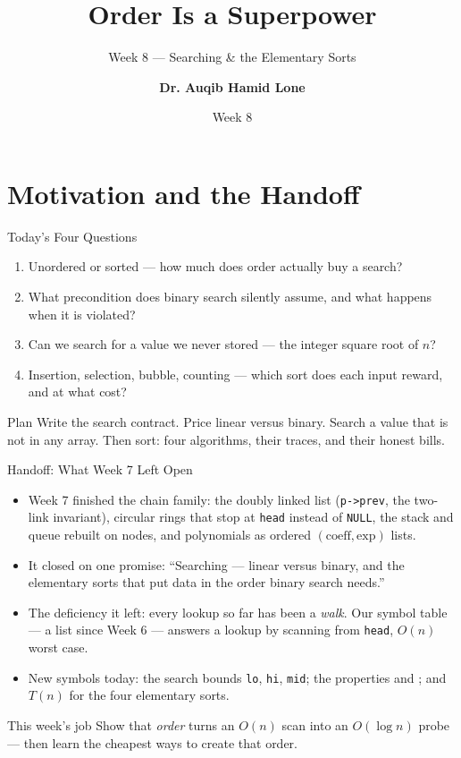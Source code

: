 \documentclass[aspectratio=169]{beamer}
\title{Order Is a Superpower}
\subtitle{Week 8 --- Searching \& the Elementary Sorts}
\author[Dr. Auqib Hamid Lone]{\textbf{Dr. Auqib Hamid Lone}}
\institute[GCET Ganderbal]{PCC CS-301: Data Structures\\GCET, Ganderbal}
\date[Week 8]{\small Week 8}
\begin{document}
\frame{\titlepage}

\section{Motivation and the Handoff}

\begin{frame}{Today's Four Questions}
  \begin{enumerate}
    \item Unordered or sorted --- how much does order actually buy a search?
    \item What precondition does binary search silently assume, and what
      happens when it is violated?
    \item Can we search for a value we never stored --- the integer square
      root of $n$?
    \item Insertion, selection, bubble, counting --- which sort does each
      input reward, and at what cost?
  \end{enumerate}
  \vspace{0.2cm}
  \begin{exampleblock}{Plan}
    Write the search contract. Price linear versus binary. Search a value that
    is not in any array. Then sort: four algorithms, their traces, and their
    honest bills.
  \end{exampleblock}
\end{frame}

\begin{frame}{Handoff: What Week 7 Left Open}
  \begin{itemize}
    \item Week 7 finished the chain family: the doubly linked list
      (\texttt{p->prev}, the two-link invariant), circular rings that stop at
      \texttt{head} instead of \texttt{NULL}, the stack and queue rebuilt on
      nodes, and polynomials as ordered $(\text{coeff},\text{exp})$ lists.
    \item It closed on one promise: ``Searching --- linear versus binary, and
      the elementary sorts that put data in the order binary search needs.''
    \item The deficiency it left: every lookup so far has been a
      \emph{walk}. Our symbol table --- a list since Week 6 --- answers a
      lookup by scanning from \texttt{head}, $O(n)$ worst case.
    \item New symbols today: the search bounds \texttt{lo}, \texttt{hi},
      \texttt{mid}; the properties  and ; and
      $T(n)$ for the four elementary sorts.
  \end{itemize}
  \begin{exampleblock}{This week's job}
    Show that \emph{order} turns an $O(n)$ scan into an $O(\log n)$
    probe --- then learn the cheapest ways to create that order.
  \end{exampleblock}
\end{frame}
\end{document}
